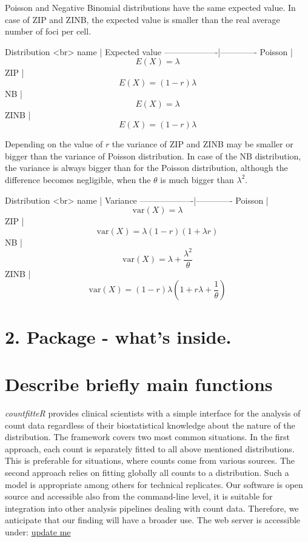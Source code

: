 Poisson and Negative Binomial distributions have the same expected value. In case of ZIP and ZINB, the expected value is smaller than the real average number of foci per cell.

Distribution <br> name  | Expected value
-------------------|-------------
Poisson            |$$E(X) = \lambda $$
ZIP                |$$E(X) = (1 - r) \lambda $$
NB                 |$$E(X) = \lambda $$
ZINB               |$$E(X) = (1 - r)  \lambda $$ 

Depending on the value of $r$ the variance of ZIP and ZINB may be smaller or bigger than the variance of Poisson distribution. In case of the NB distribution, the variance is always bigger than for the Poisson distribution, although the difference becomes negligible, when the $\theta$ is much bigger than $\lambda^2$.

Distribution <br> name  | Variance
-------------------|-------------
Poisson            |$$\textrm{var}(X) = \lambda $$
ZIP                |$$\textrm{var}(X) = \lambda (1 - r)(1 + \lambda r)$$
NB                 |$$\textrm{var}(X) = \lambda + \frac{\lambda^2}{\theta} $$
ZINB               |$$\textrm{var}(X) = (1 - r) \lambda \left( 1 + r\lambda  + \frac{1}{\theta} \right)$$



\section{2. Package - what's inside.}



\section{Describe briefly main functions}

\emph{countfitteR} provides clinical scientists with a simple interface for the analysis of count data regardless of their biostatistical knowledge about the nature of the distribution. The framework covers two most common situations. In the first approach, each count is separately fitted to all above mentioned distributions. This is preferable for situations, where counts come from various sources. The second approach relies on fitting globally all counts to a distribution. Such a model is appropriate among others for technical replicates.
Our software is open source and accessible also from the command-line level, it is suitable for integration into other analysis pipelines dealing with count data. Therefore, we anticipate that our finding will have a broader use. 
The web server is accessible under: 
\url{update me}


